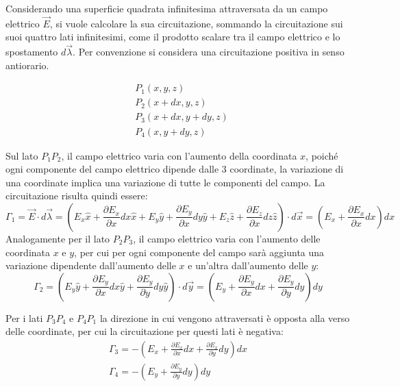 \documentclass{article}
\numberwithin{equation}{subsection}
\begin{document}
Considerando una superficie quadrata infinitesima attraversata da un campo elettrico $\vec{E}$, si vuole calcolare la sua circuitazione, sommando la circuitazione sui suoi 
quattro lati infinitesimi, come il prodotto scalare tra il campo elettrico e lo spostamento $d\vec{\lambda}$. Per convenzione si considera una circuitazione positiva in senso 
antiorario. 
\begin{center}
\end{center}
\begin{align*}
    &P_1(x,y,z)\\
    &P_2(x+dx,y,z)\\
    &P_3(x+dx,y+dy,z)\\
    &P_4(x,y+dy,z)
\end{align*}

Sul lato $P_1P_2$, il campo elettrico varia con l'aumento della coordinata $x$, poiché ogni componente del campo elettrico dipende dalle $3$ coordinate, la variazione di una 
coordinate implica una variazione di tutte le componenti del campo. La circuitazione risulta quindi essere:
\begin{equation*}
    \Gamma_1=\vec{E}\cdot d\vec{\lambda}=\left(E_x\hat{x}+\displaystyle\frac{\partial E_x}{\partial x}dx\hat{x}+E_y\hat{y}+\frac{\partial E_y}{\partial x}dy\hat{y}+E_z\hat{z}+\frac{\partial E_z}{\partial x}dz\hat{z}\right)\cdot d\vec{x}=\left(E_x+\frac{\partial E_x}{\partial x}dx\right)dx
\end{equation*}
Analogamente per il lato $P_2P_3$, il campo elettrico varia con l'aumento delle coordinata $x$ e $y$, per cui per ogni componente del campo sarà aggiunta una variazione dipendente 
dall'aumento delle $x$ e un'altra dall'aumento delle $y$:
\begin{equation*}
    \Gamma_2=\left(E_y\hat{y}+\displaystyle\frac{\partial E_y}{\partial x}dx\hat{y}+\frac{\partial E_y}{\partial y}dy\hat{y}\right)\cdot d\vec{y}=\left(E_y+\frac{\partial E_y}{\partial x}dx+\frac{\partial E_y}{\partial y}dy\right)dy
\end{equation*}

Per i lati $P_3P_4$ e $P_4P_1$ la direzione in cui vengono attraversati è opposta alla verso delle coordinate, per cui la circuitazione per questi lati è negativa:
\begin{gather*}
    \Gamma_3=-\left(E_x+\displaystyle\frac{\partial E_x}{\partial x}dx+\frac{\partial E_x}{\partial y}dy\right)dx\\
    \Gamma_4=-\left(E_y+\displaystyle\frac{\partial E_y}{\partial y}dy\right)dy
\end{gather*} 
\end{document}
